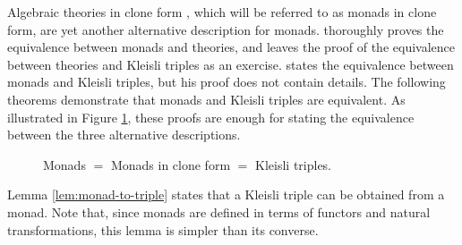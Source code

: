 Algebraic theories in clone form \parencite[24]{manes-1976}, which
will be referred to as monads in clone form, are yet another
alternative description for monads. \textcite[26--29]{manes-1976}
thoroughly proves the equivalence between monads and theories, and
leaves the proof of the equivalence between theories and Kleisli triples as an
exercise. \textcite[61]{moggi-1991} states the equivalence between
monads and Kleisli triples, but his proof does not contain details. The
following theorems demonstrate that monads and Kleisli triples are equivalent.
As illustrated in Figure \ref{fig:monad-theory-triple}, these proofs
are enough for stating the equivalence between the three alternative
descriptions.
\begin{figure}[htbp]
  \begin{center}
  \end{center}
  \caption{Monads $=$ Monads in clone form $=$ Kleisli triples.}
  \label{fig:monad-theory-triple}
\end{figure}

Lemma \ref{lem:monad-to-triple} states that a Kleisli triple can be obtained
from a monad. Note that, since monads are defined in terms of functors
and natural transformations, this lemma is simpler than its converse.


